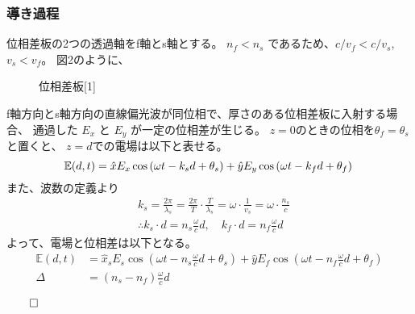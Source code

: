 \documentclass{article}
\begin{document}
\subsubsection*{導き過程}
\begin{spacing}{1.2} %
    位相差板の2つの透過軸をf軸とs軸とする。
    $n_f<n_s$ であるため、$c/v_f < c/v_s$, $v_s < v_f$。
    図2のように、
    \begin{wrapfigure}{r}{0.3\textwidth} %
        \caption{位相差板[1]}
        \label{fig:2}
    \end{wrapfigure}
    f軸方向とs軸方向の直線偏光波が同位相で、厚さのある位相差板に入射する場合、
    通過した $E_x$ と $E_y$ が一定の位相差が生じる。
    $z = 0$のときの位相を$\theta_f = \theta_s$と置くと、
    $z = d$での電場は以下と表せる。
\begin{equation}
    \mathbb{E}(d, t)=\hat{x} E_x \cos \left(\omega t-k_s d+\theta_s\right)+\hat{y} E_y \cos \left(\omega t-k_f d+\theta_f\right) \notag\\
\end{equation}
また、波数の定義より
\begin{align*} %
    & k_s=\frac{2 \pi}{\lambda_s}=\frac{2 \pi}{T} \cdot \frac{T}{\lambda_s}=\omega \cdot \frac{1}{v_s}=\omega \cdot \frac{n_s}{c} \\
    & \therefore k_s \cdot d=n_s \frac{\omega}{c} d, \quad k_f \cdot d=n_f \frac{\omega}{c} d 
\end{align*}
よって、電場と位相差は以下となる。
\begin{align*} %
    \mathbb{E}(d, t)&=\hat{x}_s E_s \cos \left(\omega t-n_s \frac{\omega}{c} d+\theta_s\right)+\hat{y} E_f \cos \left(\omega t-n_f \frac{\omega}{c} d+\theta_f\right) \\
    \Delta&=\left(n_s-n_f\right) \frac{\omega}{c} d 
\end{align*}

\begin{flushright} %
    $\qed$
\end{flushright}

\end{spacing}
\end{document}
